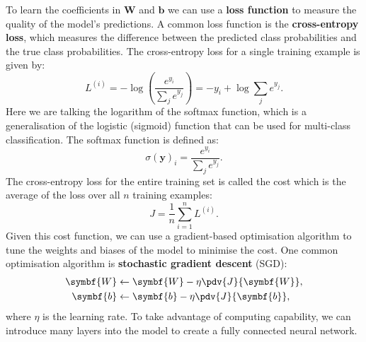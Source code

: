 \documentclass{article}
\begin{document}
To learn the coefficients in \(\symbf{W}\) and \(\symbf{b}\) we can use
a \textbf{loss function} to measure the quality of the model's
predictions. A common loss function is the \textbf{cross-entropy loss},
which measures the difference between the predicted class probabilities
and the true class probabilities. The cross-entropy loss for a single
training example is given by:
\begin{equation*}
    L^{\left( i \right)} = -\log{\left( \frac{e^{y_i}}{\sum_j e^{y_j}} \right)} = -y_i + \log{\sum_j e^{y_j}}.
\end{equation*}
Here we are talking the logarithm of the softmax function, which is a
generalisation of the logistic (sigmoid) function that can be used for
multi-class classification. The softmax function is defined as:
\begin{equation*}
    \sigma \left( \symbf{y} \right)_i = \frac{e^{y_i}}{\sum_j e^{y_j}}.
\end{equation*}
The cross-entropy loss for the entire training set is called the cost
which is the average of the loss over all \(n\) training examples:
\begin{equation*}
    J = \frac{1}{n} \sum_{i = 1}^n L^{\left( i \right)}.
\end{equation*}
Given this cost function, we can use a gradient-based optimisation
algorithm to tune the weights and biases of the model to minimise the
cost. One common optimisation algorithm is \textbf{stochastic gradient
    descent} (SGD):
\begin{align*}
    \symbf{W} & \gets \symbf{W} - \eta \pdv{J}{\symbf{W}}, \\
    \symbf{b} & \gets \symbf{b} - \eta \pdv{J}{\symbf{b}},
\end{align*}
where \(\eta\) is the learning rate. To take advantage of computing
capability, we can introduce many layers into the model to create a
fully connected neural network.
\end{document}
